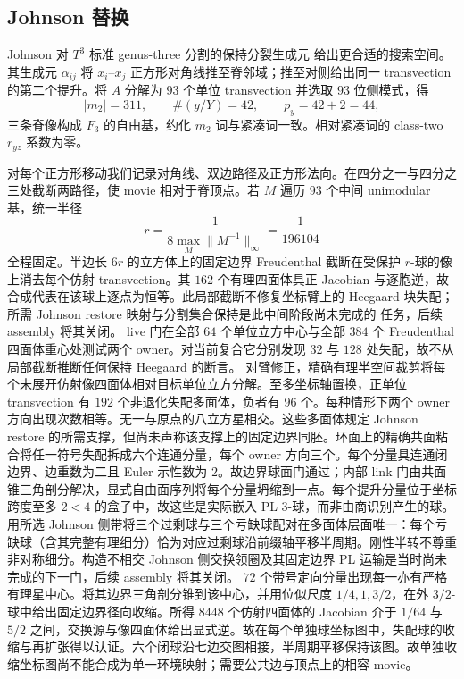 \documentclass[11pt]{amsart}
\theoremstyle{definition}
\theoremstyle{remark}
\begin{document}
\subsection{Johnson 替换}

Johnson 对 $T^3$ 标准 genus-three 分割的保持分裂生成元
\cite{Johnson2011} 给出更合适的搜索空间。其生成元
$\alpha_{ij}$ 将 $x_i$--$x_j$ 正方形对角线推至脊邻域；推至对侧给出同一 transvection 的第二个提升。将 $A$ 分解为 $93$ 个单位 transvection 并选取 $93$ 位侧模式，得
\[
|m_2|=311,\qquad \#(y/Y)=42,\qquad p_y=42+2=44,
\]
三条脊像构成 $F_3$ 的自由基，约化 $m_2$ 词与紧凑词一致。相对紧凑词的 class-two $r_{yz}$ 系数为零。

对每个正方形移动我们记录对角线、双边路径及正方形法向。在四分之一与四分之三处截断两路径，使 movie 相对于脊顶点。若 $M$ 遍历 $93$ 个中间 unimodular 基，统一半径
\[
r=\frac{1}{8\max_M\lVert M^{-1}\rVert_\infty}=\frac1{196104}
\]
全程固定。半边长 $6r$ 的立方体上的固定边界 Freudenthal 截断在受保护 $r$-球的像上消去每个仿射 transvection。其 $162$ 个有理四面体具正
Jacobian 与逐胞逆，故合成代表在该球上逐点为恒等。此局部截断不修复坐标臂上的 Heegaard
块失配；所需 Johnson restore 映射与分割集合保持是此中间阶段尚未完成的
任务，后续 assembly 将其关闭。
live 门在全部 $64$ 个单位立方中心与全部 $384$ 个
Freudenthal 四面体重心处测试两个 owner。对当前复合它分别发现 $32$
与 $128$ 处失配，故不从局部截断推断任何保持 Heegaard 的断言。
对臂修正，精确有理半空间裁剪将每个未展开仿射像四面体相对目标单位立方分解。至多坐标轴置换，正单位 transvection 有 $192$ 个非退化失配多面体，负者有 $96$ 个。每种情形下两个 owner 方向出现次数相等。无一与原点的八立方星相交。这些多面体规定 Johnson restore 的所需支撑，但尚未声称该支撑上的固定边界同胚。环面上的精确共面粘合将任一符号失配拆成六个连通分量，每个 owner 方向三个。每个分量具连通闭边界、边重数为二且 Euler 示性数为 $2$。故边界球面门通过；内部 link 门由共面锥三角剖分解决，显式自由面序列将每个分量坍缩到一点。每个提升分量位于坐标跨度至多 $2<4$ 的盒子中，故这些是实际嵌入 PL $3$-球，而非由商识别产生的球。用所选 Johnson 侧带将三个过剩球与三个亏缺球配对在多面体层面唯一：每个亏缺球（含其完整有理细分）恰为对应过剩球沿前缀轴平移半周期。刚性半转不尊重非对称细分。构造不相交 Johnson 侧交换领圈及其固定边界 PL 运输是当时尚未完成的下一门，后续 assembly 将其关闭。
$72$ 个带号定向分量出现每一亦有严格有理星中心。将其边界三角剖分锥到该中心，并用位似尺度 $1/4,1,3/2$，在外 $3/2$-球中给出固定边界径向收缩。所得 $8448$ 个仿射四面体的 Jacobian 介于 $1/64$ 与 $5/2$ 之间，交换源与像四面体给出显式逆。故在每个单独球坐标图中，失配球的收缩与再扩张得以认证。六个闭球沿七边交图相接，半周期平移保持该图。故单独收缩坐标图尚不能合成为单一环境映射；需要公共边与顶点上的相容 movie。
\end{document}
